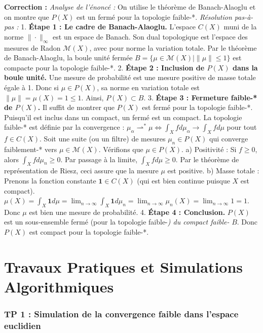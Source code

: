 \documentclass[11pt,a4paper]{article}
\begin{document}
\textbf{Correction :}
\textit{Analyse de l'énoncé :} On utilise le théorème de Banach-Alaoglu et on montre que $P(X)$ est un fermé pour la topologie faible-*.
\textit{Résolution pas-à-pas :}
1. \textbf{Étape 1 : Le cadre de Banach-Alaoglu.}
   L'espace $C(X)$ muni de la norme $\| \cdot \|_\infty$ est un espace de Banach.
   Son dual topologique est l'espace des mesures de Radon $\mathcal{M}(X)$, avec pour norme la variation totale.
   Par le théorème de Banach-Alaoglu, la boule unité fermée $B = \{ \mu \in \mathcal{M}(X) \mid \|\mu\| \le 1 \}$ est compacte pour la topologie faible-*.
2. \textbf{Étape 2 : Inclusion de $P(X)$ dans la boule unité.}
   Une mesure de probabilité est une mesure positive de masse totale égale à 1.
   Donc si $\mu \in P(X)$, sa norme en variation totale est $\|\mu\| = \mu(X) = 1 \le 1$.
   Ainsi, $P(X) \subset B$.
3. \textbf{Étape 3 : Fermeture faible-* de $P(X)$.}
   Il suffit de montrer que $P(X)$ est fermé pour la topologie faible-*. Puisqu'il est inclus dans un compact, un fermé est un compact.
   La topologie faible-* est définie par la convergence : $\mu_\alpha \rightharpoonup^* \mu \iff \int_X f d\mu_\alpha \to \int_X f d\mu$ pour tout $f \in C(X)$.
   Soit une suite (ou un filtre) de mesures $\mu_n \in P(X)$ qui converge faiblement-* vers $\mu \in \mathcal{M}(X)$.
   Vérifions que $\mu \in P(X)$.
   a) Positivité : Si $f \ge 0$, alors $\int_X f d\mu_n \ge 0$. Par passage à la limite, $\int_X f d\mu \ge 0$. Par le théorème de représentation de Riesz, ceci assure que la mesure $\mu$ est positive.
   b) Masse totale : Prenons la fonction constante $\mathbf{1} \in C(X)$ (qui est bien continue puisque $X$ est compact).
   $\mu(X) = \int_X \mathbf{1} d\mu = \lim_{n \to \infty} \int_X \mathbf{1} d\mu_n = \lim_{n \to \infty} \mu_n(X) = \lim_{n \to \infty} 1 = 1$.
   Donc $\mu$ est bien une mesure de probabilité.
4. \textbf{Étape 4 : Conclusion.}
   $P(X)$ est un sous-ensemble fermé (pour la topologie faible-\textit{) du compact faible-} $B$. Donc $P(X)$ est compact pour la topologie faible-*.


\newpage
\part{Travaux Pratiques et Simulations Algorithmiques}

\section{TP 1 : Simulation de la convergence faible dans l'espace euclidien}
\end{document}
